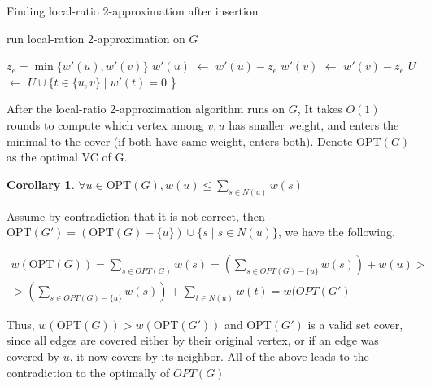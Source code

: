 \documentclass[11pt]{article}
\newcommand*\Let[2]{\State #1 $\gets$ #2}
\newtheorem{corollary}{Corollary}[theorem]
\begin{document}
\begin{algorithm}
  \caption{Finding local-ratio 2-approximation after insertion}
  \begin{algorithmic}[1]
    \Statex
        \State run local-ration 2-approximation on $G$ 
            \State {}
        \EndIf
        
            \State {}
        \EndIf
        \State $z_e=\min\{w'(u),w'(v)\}$ 
        \Let{$w'(u)$}{$w'(u) - z_e$}
        \Let{$w'(v)$}{$w'(v) - z_e$}
        \Let{$U$}{$U \cup \{t \in \{u,v\} \mid w'(t) =0$ \}}
        \State {}
    \EndFunction
  \end{algorithmic}
\end{algorithm}

After the local-ratio 2-approximation algorithm runs on $G$, It takes $O(1)$ rounds to compute which vertex among $v,u$ has smaller weight, and enters the minimal to the cover (if both have same weight, enters both).
Denote $\text{OPT}(G)$ as the optimal VC of G.

\begin{corollary}
\label{u_wight_lower_than_neighbours_sum}
$\forall u \in \text{OPT}(G), w(u) \le \underset{s \in N(u)}{\sum} w(s)$ 
\end{corollary}
Assume by contradiction that it is not correct, then 
$\text{OPT}(G') = (\text{OPT}(G) - \{u\} ) \cup \{ s \mid s \in N(u) \}$, we have the following.

\begin{align*}
\boxed{w(\text{OPT}(G))} = \underset{s \in OPT(G)}{\sum} w(s) = ( \underset{s \in OPT(G) - \{u\} }{\sum} w(s) ) + w(u) \boxed{>} \\ > ( \underset{s \in OPT(G) - \{u\} }{\sum} w(s) ) + \underset{t \in N(u) }{\sum} w(t)= \boxed{w(OPT(G')}
\end{align*}

Thus, $w(\text{OPT}(G)) > w(\text{OPT}(G'))$ and OPT$(G')$ is a valid set cover, since all edges are covered either by their original vertex, or if an edge was covered by $u$, it now covers by its neighbor. All of the above leads to the contradiction to the optimally of $OPT(G)$
\end{document}
